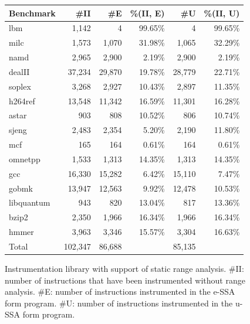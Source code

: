 \documentclass{sigplanconf}[10pt]
\begin{document}
\begin{figure}[t!]
\begin{center}
\begin{small}
\begin{tabular*}{\columnwidth}{@{\extracolsep{\fill}}|l|r|r|r|r|r|}
\hline
Benchmark  &   \#II &  \#E & \%(II, E) &  \#U & \%(II, U) \\ \hline
lbm        &  1,142 &      4 & 99.65\% &      4 & 99.65\% \\ \hline
milc       &  1,573 &  1,070 & 31.98\% &  1,065 & 32.29\% \\ \hline
namd       &  2,965 &  2,900 &  2.19\% &  2,900 &  2.19\% \\ \hline
dealII     & 37,234 & 29,870 & 19.78\% & 28,779 & 22.71\% \\ \hline
soplex     &  3,268 &  2,927 & 10.43\% &  2,897 & 11.35\% \\ \hline
h264ref    & 13,548 & 11,342 & 16.59\% & 11,301 & 16.28\% \\ \hline
astar      &    903 &    808 & 10.52\% &    806 & 10.74\% \\ \hline
sjeng      &  2,483 &  2,354 &  5.20\% &  2,190 & 11.80\% \\ \hline
mcf        &    165 &    164 &  0.61\% &    164 &  0.61\% \\ \hline
omnetpp    &  1,533 &  1,313 & 14.35\% &  1,313 & 14.35\% \\ \hline
gcc        & 16,330 & 15,282 &  6.42\% & 15,110 &  7.47\% \\ \hline
gobmk      & 13,947 & 12,563 &  9.92\% & 12,478 & 10.53\% \\ \hline
libquantum &    943 &    820 & 13.04\% &    817 & 13.36\% \\ \hline
bzip2      &  2,350 &  1,966 & 16.34\% &  1,966 & 16.34\% \\ \hline
hmmer      &  3,963 &  3,346 & 15.57\% &  3,304 & 16.63\% \\ \hline
Total      & 102,347 & 86,688 &        & 85,135 &         \\ \hline
\end{tabular*}
\end{small}
\end{center}
\caption{\label{fig:prunningTable}
Instrumentation library with support of static range analysis.
\#II: number of instructions that have been instrumented without range
analysis.
\#E: number of instructions instrumented in the e-SSA form program.
\#U: number of instructions instrumented in the u-SSA form program.}
\end{figure}
\end{document}
